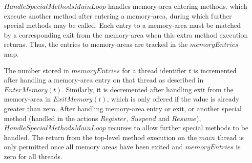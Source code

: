 $HandleSpecialMethodsMainLoop$ handles memory-area entering
methods, which execute another method after entering a memory-area,
during which further special methods may be called.
Each entry to a memory-area must be matched by a corresponding exit
from the memory-area when this extra method execution returns.
Thus, the entries to memory-areas are tracked in the $memoryEntries$
map.

The number stored in $memoryEntries$ for a thread identifier $t$ is
incremented after handling a memory-area entry on that thread as
described in $EnterMemory(t)$.
Similarly, it is decremented after handling exit from the memory-area
in $ExitMemory(t)$, which is only offered if the value is already
greater than zero.
After handling memory-area entry or exit, or another special method
(handled in the actions $Register$, $Suspend$ and $Resume$),
$HandleSpecialMethodsMainLoop$ recurses to allow further special
methods to be handled.
The return from the top-level method execution on the $main$ thread is
only permitted once all memory areas have been exited and
$memoryEntries$ is zero for all threads.

